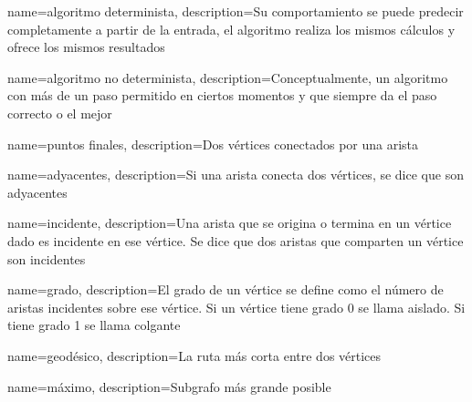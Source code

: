 

{
	name=algoritmo determinista,
	description={Su comportamiento se puede predecir completamente a partir de la entrada, el algoritmo realiza los mismos cálculos y ofrece los mismos resultados\cite{Black2009_DeterministicAlgorithm}}
}

{
	name=algoritmo no determinista,
	description={Conceptualmente, un algoritmo con más de un paso permitido en ciertos momentos y que siempre da el paso correcto o el mejor}
}

{
	name=puntos finales,
	description={Dos vértices conectados por una arista}
}

{
	name=adyacentes,
	description={Si una arista conecta dos vértices, se dice que son adyacentes}
}

{
	name=incidente,
	description={Una arista que se origina o termina en un vértice dado es incidente en ese vértice. Se dice que dos aristas que comparten un vértice son incidentes}
}

{
	name=grado,
	description={El grado de un vértice se define como el número de aristas incidentes sobre ese vértice. Si un vértice tiene grado 0 se llama aislado. Si tiene grado 1 se llama colgante}
}

{
	name=geodésico,
	description={La ruta más corta entre dos vértices}
}

{
	name=máximo,
	description={Subgrafo más grande posible}
}